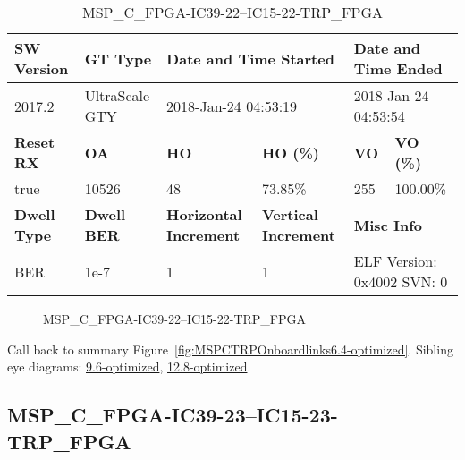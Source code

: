 \begin{table}[h]
\centering
\caption{MSP\_C\_FPGA-IC39-22--IC15-22-TRP\_FPGA}
\label{tab:MSPCFPGAIC3922IC1522TRPFPGA6.4-optimized}
\begin{tabular}{@{}|l|l|l|l|l|l|@{}}
\toprule
\textbf{SW Version}                & \textbf{GT Type}   & \multicolumn{2}{l|}{\textbf{Date and Time Started}}            & \multicolumn{2}{l|}{\textbf{Date and Time Ended}}        \\ \midrule
2017.2                       & UltraScale GTY          & \multicolumn{2}{l|}{2018-Jan-24 04:53:19}                   & \multicolumn{2}{l|}{2018-Jan-24 04:53:54}               \\ \midrule
\textbf{Reset RX}                  & \textbf{OA} & \textbf{HO}   & \textbf{HO (\%)} & \textbf{VO} & \textbf{VO (\%)} \\ \midrule
true & 10526        & 48          & 73.85\%        & 255        & 100.00\%       \\ \midrule
\textbf{Dwell Type}                & \textbf{Dwell BER} & \textbf{Horizontal Increment} & \textbf{Vertical Increment}    & \multicolumn{2}{l|}{\textbf{Misc Info}}                  \\ \midrule
BER                            & 1e-7        & 1        & 1           & \multicolumn{2}{l|}{ELF Version: 0x4002 SVN: 0}                         \\ \bottomrule
\end{tabular}
\end{table}

\begin{figure}[h]
\caption{MSP\_C\_FPGA-IC39-22--IC15-22-TRP\_FPGA} \label{fig:MSPCFPGAIC3922IC1522TRPFPGA6.4-optimized}
\end{figure}

Call back to summary Figure~\ref{fig:MSPCTRPOnboardlinks6.4-optimized}.
Sibling eye diagrams: \hyperref[sec:MSPCFPGAIC3922IC1522TRPFPGA9.6-optimized]{9.6-optimized}, \hyperref[sec:MSPCFPGAIC3922IC1522TRPFPGA12.8-optimized]{12.8-optimized}.

\clearpage
\newpage


\subsection{MSP\_C\_FPGA-IC39-23--IC15-23-TRP\_FPGA}\label{sec:MSPCFPGAIC3923IC1523TRPFPGA6.4-optimized}

